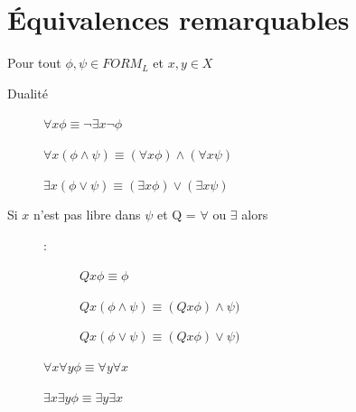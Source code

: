 \section{Équivalences remarquables}
Pour tout $\phi , \psi \in FORM_L$ et $x,y \in X$
\begin{description}
\item[Dualité] $\forall x \phi \equiv \neg \exists x \neg \phi$
\item[] $\forall x ( \phi \wedge \psi ) \equiv (\forall x \phi) \wedge (\forall x \psi)$
\item[] $\exists x ( \phi \vee \psi ) \equiv (\exists x \phi) \vee (\exists x \psi)$
\item[Si $x$ n'est pas libre dans $\psi$ et Q = $\forall$ ou $\exists$ alors]:\\
\begin{description}
\item[] $Qx \phi \equiv \phi$
\item[] $Qx(\phi \wedge \psi) \equiv (Qx \phi) \wedge \psi)$
\item[] $Qx(\phi \vee \psi) \equiv (Qx \phi) \vee \psi)$
\end{description}
\item[] $\forall x \forall y \phi \equiv \forall y \forall x$
\item[] $\exists x \exists y \phi \equiv \exists y \exists x$
\end{description}

\pagebreak

